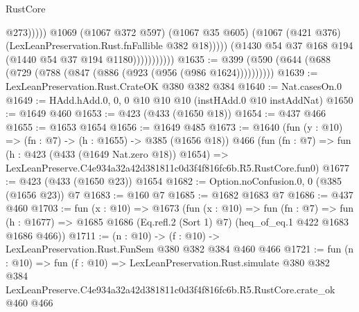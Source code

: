 \begin{lexlean}{RustCore}
\begin{coremodule}
                                      @273)))))
                            @1069
                            (@1067 @372 @597)
                            (@1067 @35 @605)
                            (@1067 (@421 @376) (LexLeanPreservation.Rust.fnFallible @382 @18)))))
                      (@1430 @54 @37 @168 @194 (@1440 @54 @37 @194 @1180)))))))))))
@1635 := @399 (@590 (@644 (@688 (@729 (@788 (@847 (@886 (@923 (@956 (@986 @1624))))))))))
@1639 := LexLeanPreservation.Rust.CrateOK @380 @382 @384
@1640 := Nat.casesOn.{0}
@1649 := HAdd.hAdd.{0, 0, 0} @10 @10 @10 (instHAdd.{0} @10 instAddNat)
@1650 := @1649 @460
@1653 := @423 (@433 (@1650 @18))
@1654 := @437 @466
@1655 := @1653 @1654
@1656 := @1649 @485
@1673 := @1640
    (fun (y : @10) => (fn : @7) -> (h : @1655) -> @385 (@1656 @18))
    @466
    (fun (fn : @7) =>
    fun (h : @423 (@433 (@1649 Nat.zero @18)) @1654) =>
    LexLeanPreserve.C4e934a32a42d381811c0d3f4f816fc6b.R5.RustCore.fun0)
@1677 := @423 (@433 (@1650 @23)) @1654
@1682 := Option.noConfusion.{0, 0} (@385 (@1656 @23)) @7
@1683 := @160 @7
@1685 := @1682 @1683 @7
@1686 := @437 @460
@1703 := fun (x : @10) =>
  @1673
    (fun (x : @10) =>
    fun (fn : @7) =>
    fun (h : @1677) => @1685 @1686 (Eq.refl.{2} (Sort 1) @7) (heq_of_eq.{1} @422 @1683 @1686 @466))
@1711 := (n : @10) -> (f : @10) -> LexLeanPreservation.Rust.FunSem @380 @382 @384 @460 @466
@1721 := fun (n : @10) =>
  fun (f : @10) =>
  LexLeanPreservation.Rust.simulate
    @380
    @382
    @384
    LexLeanPreserve.C4e934a32a42d381811c0d3f4f816fc6b.R5.RustCore.crate_ok
    @460
    @466
\end{coremodule}
\end{lexlean}
